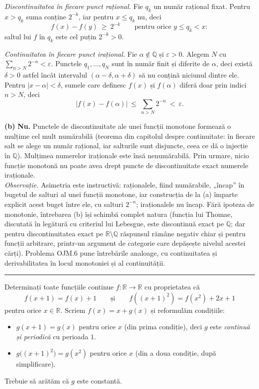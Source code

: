 \emph{Discontinuitatea în fiecare punct rațional.} Fie $q_k$ un număr rațional fixat. Pentru $x>q_k$ suma conține $2^{-k}$, iar pentru $x\le q_k$ nu, deci
\[ f(x)-f(y)\ \ge\ 2^{-k}\qquad\text{pentru orice } y\le q_k<x : \]
saltul lui $f$ în $q_k$ este cel puțin $2^{-k}>0$.

\emph{Continuitatea în fiecare punct irațional.} Fie $\alpha\notin\mathbb{Q}$ și $\varepsilon>0$. Alegem $N$ cu $\sum_{n>N}2^{-n}<\varepsilon$. Punctele $q_1,\dots,q_N$ sunt în număr finit și diferite de $\alpha$, deci există $\delta>0$ astfel încât intervalul $(\alpha-\delta,\alpha+\delta)$ să nu conțină niciunul dintre ele. Pentru $|x-\alpha|<\delta$, sumele care definesc $f(x)$ și $f(\alpha)$ diferă doar prin indici $n>N$, deci
\[ |f(x)-f(\alpha)|\ \le\ \sum_{n>N}2^{-n}\ <\ \varepsilon . \]

\noindent\textbf{(b)} \textbf{Nu.} Punctele de discontinuitate ale unei funcții monotone formează o mulțime cel mult numărabilă (teorema din capitolul despre continuitate: în fiecare salt se alege un număr rațional, iar salturile sunt disjuncte, ceea ce dă o injecție în $\mathbb{Q}$). Mulțimea numerelor iraționale este însă nenumărabilă. Prin urmare, nicio funcție monotonă nu poate avea drept puncte de discontinuitate exact numerele iraționale.\\[2pt]
\emph{Observație.} Asimetria este instructivă: raționalele, fiind numărabile, „încap'' în bugetul de salturi al unei funcții monotone, iar construcția de la (a) împarte explicit acest buget între ele, cu salturi $2^{-n}$; iraționalele nu încap. Fără ipoteza de monotonie, întrebarea (b) își schimbă complet natura (funcția lui Thomae, discutată în legătură cu criteriul lui Lebesgue, este discontinuă exact pe $\mathbb{Q}$; dar pentru discontinuitatea exact pe $\mathbb{R}\setminus\mathbb{Q}$ răspunsul rămâne negativ chiar și pentru funcții arbitrare, printr-un argument de categorie care depășește nivelul acestei cărți). Problema OJM.6 pune întrebările analoage, cu continuitatea și derivabilitatea în locul monotoniei și al continuității.
\vspace{1mm}\hrule

Determinați toate funcțiile continue $f:\mathbb{R}\to\mathbb{R}$ cu proprietatea că
\[
f(x+1)=f(x)+1 \qquad \text{și} \qquad f\!\left((x+1)^2\right)=f(x^2)+2x+1
\]
pentru orice $x\in\mathbb{R}$.
\sol Scriem $f(x)=x+g(x)$ și reformulăm condițiile:
\begin{itemize}[nosep,leftmargin=1.5em]
\item[(1)] $g(x+1)=g(x)$ pentru orice $x$ (din prima condiție), deci $g$ este \emph{continuă și periodică} cu perioada $1$.
\item[(2)] $g\bigl((x+1)^2\bigr)=g(x^2)$ pentru orice $x$ (din a doua condiție, după simplificare).
\end{itemize}
Trebuie să arătăm că $g$ este constantă.

